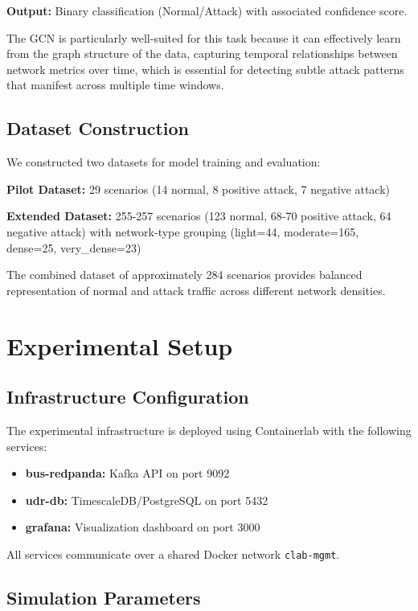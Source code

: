 \documentclass[conference]{IEEEtran}
\begin{document}
\textbf{Output:} Binary classification (Normal/Attack) with associated confidence score.

The GCN is particularly well-suited for this task because it can effectively learn from the graph structure of the data, capturing temporal relationships between network metrics over time, which is essential for detecting subtle attack patterns that manifest across multiple time windows.

\subsection{Dataset Construction}

We constructed two datasets for model training and evaluation:

\textbf{Pilot Dataset:} 29 scenarios (14 normal, 8 positive attack, 7 negative attack)

\textbf{Extended Dataset:} 255-257 scenarios (123 normal, 68-70 positive attack, 64 negative attack) with network-type grouping (light=44, moderate=165, dense=25, very\_dense=23)

The combined dataset of approximately 284 scenarios provides balanced representation of normal and attack traffic across different network densities.

\section{Experimental Setup}
\label{sec:experimental}

\subsection{Infrastructure Configuration}

The experimental infrastructure is deployed using Containerlab with the following services:

\begin{itemize}
    \item \textbf{bus-redpanda:} Kafka API on port 9092
    \item \textbf{udr-db:} TimescaleDB/PostgreSQL on port 5432
    \item \textbf{grafana:} Visualization dashboard on port 3000
\end{itemize}

All services communicate over a shared Docker network \texttt{clab-mgmt}.

\subsection{Simulation Parameters}
\end{document}
